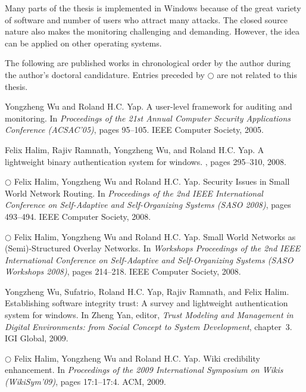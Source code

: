 Many parts of the thesis is implemented in Windows because of the great
variety of software and number of users who attract many attacks.
The closed source nature also makes the monitoring challenging and
demanding.
However, the idea can be applied on other operating systems.

The following are published works in chronological order
by the author during the author's doctoral candidature.
Entries preceded by $\bigcirc$ are not related to this thesis.

\begin{tightenumerate}
\item
Yongzheng Wu and Roland H.C. Yap.
\newblock A user-level framework for auditing and monitoring.
\newblock In {\em Proceedings of the 21st Annual Computer Security Applications
  Conference (ACSAC'05)}, pages 95--105. IEEE Computer Society, 2005.

\item
Felix Halim, Rajiv Ramnath, Yongzheng Wu, and Roland H.C. Yap.
\newblock A lightweight binary authentication system for windows.
, pages 295--310, 2008.

\item $\bigcirc$
Felix Halim, Yongzheng Wu and Roland H.C. Yap.
\newblock Security Issues in Small World Network Routing.
\newblock In {\em Proceedings of the 2nd IEEE International Conference on
  Self-Adaptive and Self-Organizing Systems (SASO 2008)},
  pages 493--494. IEEE Computer Society, 2008.

\item $\bigcirc$
Felix Halim, Yongzheng Wu and Roland H.C. Yap.
\newblock Small World Networks as (Semi)-Structured Overlay Networks.
\newblock In {\em Workshops Proceedings of the 2nd IEEE International
  Conference on Self-Adaptive and Self-Organizing Systems
  (SASO Workshops 2008)},
  pages 214--218. IEEE Computer Society, 2008.

\item
Yongzheng Wu, Sufatrio, Roland H.C. Yap, Rajiv Ramnath, and Felix Halim.
\newblock Establishing software integrity trust: A survey and lightweight
  authentication system for windows.
\newblock In Zheng Yan, editor, {\em Trust Modeling and Management in Digital
  Environments: from Social Concept to System Development}, chapter~3. IGI
  Global, 2009.

\item $\bigcirc$
Felix Halim, Yongzheng Wu and Roland H.C. Yap.
\newblock Wiki credibility enhancement.
\newblock In {\em Proceedings of the 2009 International Symposium on Wikis (WikiSym'09)},
  pages 17:1--17:4. ACM, 2009.


\end{tightenumerate}
